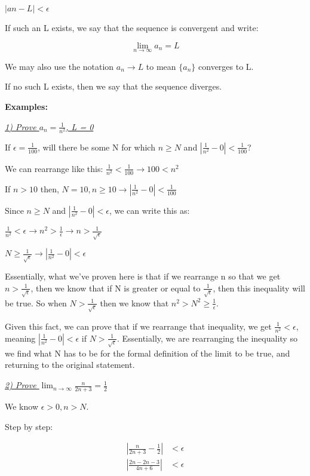 \documentclass[11pt]{article}
\begin{document}
\begin{center}
    $|an - L| < \epsilon$
\end{center}

If such an L exists, we say that the sequence is convergent and write:

\begin{center}
    $$\lim_{n\to\infty} a_n = L$$
\end{center}

We may also use the notation $a_n \rightarrow L$ to mean $\{a_n\}$ converges to L.

If no such L exists, then we say that the sequence diverges.

\bigskip

\textbf{Examples: }

\textit{\underline{1) Prove $a_n=\frac{1}{n^2}$, L = 0}}
\smallskip

If $\epsilon = \frac{1}{100}$, will there be some N for which $n \geq N$ and $|
\frac{1}{n^2} - 0| < \frac{1}{100}$?
\medskip

We can rearrange like this: $\frac{1}{n^2} < \frac{1}{100} \rightarrow 100 < n^2$

If $n > 10$ then, $N = 10, n \geq 10 \rightarrow |\frac{1}{n^2} - 0| < \frac{1}{100}$

Since $n \geq N$ and $|\frac{1}{n^2} - 0| < \epsilon$, we can write this as:

$\frac{1}{n^2} < \epsilon \rightarrow n^2 > \frac{1}{\epsilon} \rightarrow n > \frac{1}{\sqrt{\epsilon}}$

$N \geq \frac{1}{\sqrt{\epsilon}} \rightarrow |\frac{1}{n^2} - 0| < \epsilon$
\medskip

Essentially, what we've proven here is that if we rearrange n so that we get $n > \frac{1}{\sqrt{\epsilon}}$, then we know that if N is greater or equal to $\frac{1}{\sqrt{\epsilon}}$, then this inequality will be true. So when $N > \frac{1}{\sqrt{\epsilon}}$ then we know that $n^2 > N^2 \geq \frac{1}{\epsilon}$. 

Given this fact, we can prove that if we rearrange that inequality, we get $\frac{1}{n^2} < \epsilon$, meaning $|\frac{1}{n^2} - 0| < \epsilon$ if $N > \frac{1}{\sqrt{\epsilon}}$. Essentially, we are rearranging the inequality so we find what N has to be for the formal definition of the limit to be true, and  returning to the original statement.
\medskip

\textit{\underline{2) Prove $\lim_{n\to\infty} \frac{n}{2n+3} = \frac{1}{2}$}}
\smallskip

We know $\epsilon > 0, n > N$.

Step by step:

\begin{align}
    |\frac{n}{2n+3} - \frac{1}{2}| &< \epsilon\\
    |\frac{2n-2n-3}{4n+6}| &< \epsilon\\
\end{align}
\end{document}
